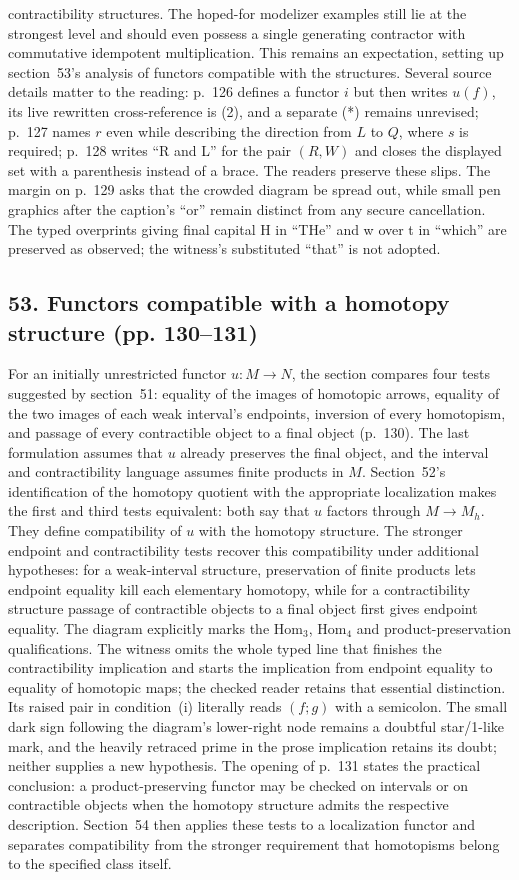 \documentclass[10pt,oneside]{book}
\begin{document}
contractibility structures. The hoped-for modelizer examples still lie at the strongest level and should even possess a single generating contractor with commutative idempotent multiplication. This remains an expectation, setting up section~53's analysis of functors compatible with the structures. Several source details matter to the reading: p.~126 defines a functor $i$ but then writes $u(f)$, its live rewritten cross-reference is (2), and a separate (*) remains unrevised; p.~127 names $r$ even while describing the direction from $L$ to $Q$, where $s$ is required; p.~128 writes ``R and L'' for the pair $(R,W)$ and closes the displayed set with a parenthesis instead of a brace. The readers preserve these slips. The margin on p.~129 asks that the crowded diagram be spread out, while small pen graphics after the caption's ``or'' remain distinct from any secure cancellation. The typed overprints giving final capital H in ``THe'' and w over t in ``which'' are preserved as observed; the witness's substituted ``that'' is not adopted.

\subsection*{53. Functors compatible with a homotopy structure (pp. 130--131)}
For an initially unrestricted functor $u:M\to N$, the section compares four tests suggested by section~51: equality of the images of homotopic arrows, equality of the two images of each weak interval's endpoints, inversion of every homotopism, and passage of every contractible object to a final object (p.~130). The last formulation assumes that $u$ already preserves the final object, and the interval and contractibility language assumes finite products in $M$. Section~52's identification of the homotopy quotient with the appropriate localization makes the first and third tests equivalent: both say that $u$ factors through $M\to M_h$. They define compatibility of $u$ with the homotopy structure. The stronger endpoint and contractibility tests recover this compatibility under additional hypotheses: for a weak-interval structure, preservation of finite products lets endpoint equality kill each elementary homotopy, while for a contractibility structure passage of contractible objects to a final object first gives endpoint equality. The diagram explicitly marks the $\mathrm{Hom}_3$, $\mathrm{Hom}_4$ and product-preservation qualifications. The witness omits the whole typed line that finishes the contractibility implication and starts the implication from endpoint equality to equality of homotopic maps; the checked reader retains that essential distinction. Its raised pair in condition~(i) literally reads $(f;g)$ with a semicolon. The small dark sign following the diagram's lower-right node remains a doubtful star/1-like mark, and the heavily retraced prime in the prose implication retains its doubt; neither supplies a new hypothesis. The opening of p.~131 states the practical conclusion: a product-preserving functor may be checked on intervals or on contractible objects when the homotopy structure admits the respective description. Section~54 then applies these tests to a localization functor and separates compatibility from the stronger requirement that homotopisms belong to the specified class itself.
\end{document}
